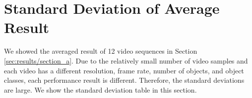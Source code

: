 \section{Standard Deviation of Average Result}
\label{sec:appendix/section_std_dev}

We showed the averaged result of 12 video sequences in Section \ref{sec:results/section_a}. Due to the relatively small number of video samples and each video has a different resolution, frame rate, number of objects, and object classes, each performance result is different. Therefore, the standard deviations are large. We show the standard deviation table in this section.
